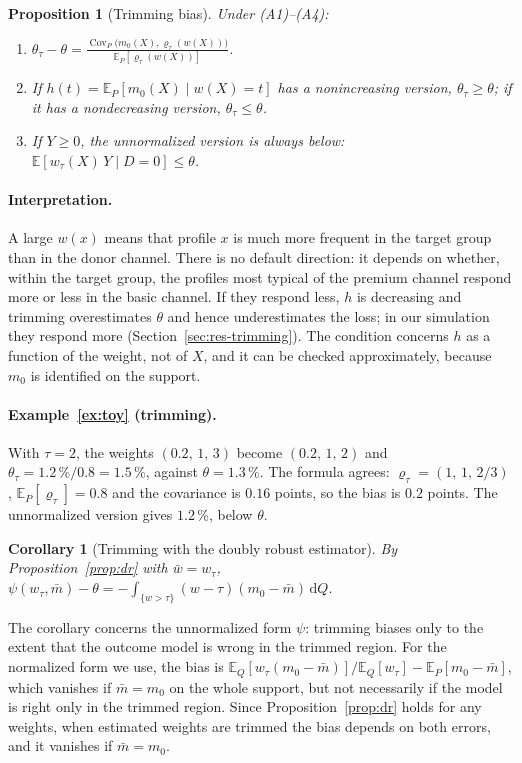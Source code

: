 \documentclass[twoside,11pt]{article}
\newcommand{\E}{\mathbb{E}}
\newcommand{\dd}{\,\mathrm{d}}
\newcommand{\Cov}{\operatorname{Cov}}
\theoremstyle{plain}
\newtheorem{proposition}{Proposition}
\newtheorem{corollary}{Corollary}
\theoremstyle{definition}
\begin{document}
\begin{proposition}[Trimming bias]\label{prop:trimming}
Under (A1)--(A4):
\begin{enumerate}
  \item $\displaystyle\theta_\tau-\theta=\frac{\Cov_P\bigl(m_0(X),\varrho_\tau(w(X))\bigr)}{\E_P[\varrho_\tau(w(X))]}$.
  \item If $h(t)=\E_P[m_0(X)\mid w(X)=t]$ has a nonincreasing version, $\theta_\tau\ge\theta$; if it has a nondecreasing version, $\theta_\tau\le\theta$.
  \item If $Y\ge0$, the unnormalized version is always below: $\E[w_\tau(X)\,Y\mid D=0]\le\theta$.
\end{enumerate}
\end{proposition}

\paragraph{Interpretation.} A large $w(x)$ means that profile $x$ is much more frequent in the target group than in the donor channel. There is no default direction: it depends on whether, within the target group, the profiles most typical of the premium channel respond more or less in the basic channel. If they respond less, $h$ is decreasing and trimming overestimates $\theta$ and hence underestimates the loss; in our simulation they respond more (Section~\ref{sec:res-trimming}). The condition concerns $h$ as a function of the weight, not of $X$, and it can be checked approximately, because $m_0$ is identified on the support.

\paragraph{Example~\ref{ex:toy} (trimming).} With $\tau=2$, the weights $(0.2,\,1,\,3)$ become $(0.2,\,1,\,2)$ and $\theta_\tau=1.2\,\%/0.8=1.5\,\%$, against $\theta=1.3\,\%$. The formula agrees: $\varrho_\tau=(1,\,1,\,2/3)$, $\E_P[\varrho_\tau]=0.8$ and the covariance is $0.16$ points, so the bias is $0.2$ points. The unnormalized version gives $1.2\,\%$, below $\theta$.

\begin{corollary}[Trimming with the doubly robust estimator]\label{cor:drtrimming}
By Proposition~\ref{prop:dr} with $\bar w=w_\tau$, $\psi(w_\tau,\bar m)-\theta=-\int_{\{w>\tau\}}(w-\tau)(m_0-\bar m)\dd Q$.
\end{corollary}
The corollary concerns the unnormalized form $\psi$: trimming biases only to the extent that the outcome model is wrong in the trimmed region. For the normalized form we use, the bias is $\E_Q[w_\tau(m_0-\bar m)]/\E_Q[w_\tau]-\E_P[m_0-\bar m]$, which vanishes if $\bar m=m_0$ on the whole support, but not necessarily if the model is right only in the trimmed region. Since Proposition~\ref{prop:dr} holds for any weights, when estimated weights are trimmed the bias depends on both errors, and it vanishes if $\bar m=m_0$.
\end{document}
